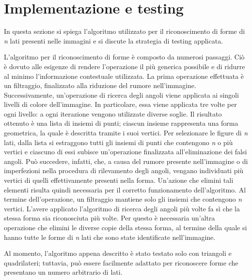 	\section*{Implementazione e testing}
		In questa sezione si spiega l'algoritmo utilizzato per il riconoscimento di forme di \emph{n} lati presenti nelle immagini e si discute la strategia di testing applicata.
		
		L'algoritmo per il riconoscimento di forme è composto da numerosi passaggi.
		Ciò è dovuto alle esigenze di rendere l'operazione il più generica possibile e di ridurre al minimo l'informazione contestuale utilizzata.
		La prima operazione effettuata è un filtraggio, finalizzato alla riduzione del rumore nell'immagine.
		Successivamente, un'operazione di ricerca degli angoli viene applicata ai singoli livelli di colore dell'immagine.
		In particolare, essa viene applicata tre volte per ogni livello: a ogni iterazione vengono utilizzate diverse soglie.
		Il risultato ottenuto è una lista di insiemi di punti; ciascun insieme rappresenta una forma geometrica, la quale è descritta tramite i suoi vertici.
		Per selezionare le figure di \emph{n} lati, dalla lista si estraggono tutti gli insiemi di punti che contengono \emph{n} o più vertici e ciascuno di essi subisce un'operazione finalizzata all'eliminazione dei falsi angoli.
		Può succedere, infatti, che, a causa del rumore presente nell'immagine o di imperfezioni nella procedura di rilevamento degli angoli, vengano individuati più vertici di quelli effettivamente presenti nella forma.
		Un'azione che elimini tali elementi risulta quindi necessaria per il corretto funzionamento dell'algoritmo.
		Al termine dell'operazione, un filtraggio mantiene solo gli insiemi che contengono \emph{n} vertici.
		L'avere applicato l'algoritmo di ricerca degli angoli più volte fa sì che la stessa forma sia riconosciuta più volte.	
		Per questo è necessaria un'altra operazione che elimini le diverse copie della stessa forma, al termine della quale si hanno tutte le forme di \emph{n} lati che sono state identificate nell'immagine. 

		Al momento, l'algoritmo appena descritto è stato testato solo con triangoli e quadrilateri; tuttavia, può essere facilmente adattato per riconoscere forme che presentano un numero arbitrario di lati. 
		
